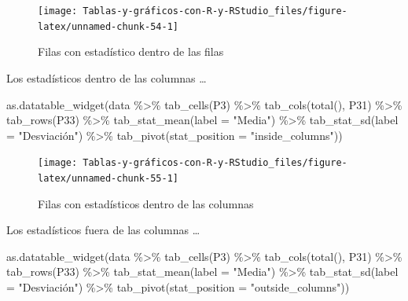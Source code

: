 \documentclass[
]{book}
\newenvironment{Shaded}{\begin{snugshade}}{\end{snugshade}}
\newcommand{\AttributeTok}[1]{\textcolor[rgb]{0.77,0.63,0.00}{#1}}
\newcommand{\FunctionTok}[1]{\textcolor[rgb]{0.00,0.00,0.00}{#1}}
\newcommand{\NormalTok}[1]{#1}
\newcommand{\SpecialCharTok}[1]{\textcolor[rgb]{0.00,0.00,0.00}{#1}}
\newcommand{\StringTok}[1]{\textcolor[rgb]{0.31,0.60,0.02}{#1}}
\begin{document}
\begin{figure}[H]

{\centering \texttt{[image: Tablas-y-gráficos-con-R-y-RStudio\_files/figure-latex/unnamed-chunk-54-1]} 

}

\caption{Filas con estadístico dentro de las filas}\label{fig:unnamed-chunk-54}
\end{figure}

Los estadísticos dentro de las columnas \ldots{}

\begin{Shaded}
\begin{Highlighting}[]
\FunctionTok{as.datatable\_widget}\NormalTok{(data }\SpecialCharTok{\%\textgreater{}\%} \FunctionTok{tab\_cells}\NormalTok{(P3) }\SpecialCharTok{\%\textgreater{}\%} \FunctionTok{tab\_cols}\NormalTok{(}\FunctionTok{total}\NormalTok{(), }
\NormalTok{  P31) }\SpecialCharTok{\%\textgreater{}\%} \FunctionTok{tab\_rows}\NormalTok{(P33) }\SpecialCharTok{\%\textgreater{}\%} \FunctionTok{tab\_stat\_mean}\NormalTok{(}\AttributeTok{label =} \StringTok{"Media"}\NormalTok{) }\SpecialCharTok{\%\textgreater{}\%} 
  \FunctionTok{tab\_stat\_sd}\NormalTok{(}\AttributeTok{label =} \StringTok{"Desviación"}\NormalTok{) }\SpecialCharTok{\%\textgreater{}\%} \FunctionTok{tab\_pivot}\NormalTok{(}\AttributeTok{stat\_position =} \StringTok{"inside\_columns"}\NormalTok{))}
\end{Highlighting}
\end{Shaded}

\begin{figure}[H]

{\centering \texttt{[image: Tablas-y-gráficos-con-R-y-RStudio\_files/figure-latex/unnamed-chunk-55-1]} 

}

\caption{Filas con estadísticos dentro de las columnas}\label{fig:unnamed-chunk-55}
\end{figure}

Los estadísticos fuera de las columnas \ldots{}

\begin{Shaded}
\begin{Highlighting}[]
\FunctionTok{as.datatable\_widget}\NormalTok{(data }\SpecialCharTok{\%\textgreater{}\%} \FunctionTok{tab\_cells}\NormalTok{(P3) }\SpecialCharTok{\%\textgreater{}\%} \FunctionTok{tab\_cols}\NormalTok{(}\FunctionTok{total}\NormalTok{(), }
\NormalTok{  P31) }\SpecialCharTok{\%\textgreater{}\%} \FunctionTok{tab\_rows}\NormalTok{(P33) }\SpecialCharTok{\%\textgreater{}\%} \FunctionTok{tab\_stat\_mean}\NormalTok{(}\AttributeTok{label =} \StringTok{"Media"}\NormalTok{) }\SpecialCharTok{\%\textgreater{}\%} 
  \FunctionTok{tab\_stat\_sd}\NormalTok{(}\AttributeTok{label =} \StringTok{"Desviación"}\NormalTok{) }\SpecialCharTok{\%\textgreater{}\%} \FunctionTok{tab\_pivot}\NormalTok{(}\AttributeTok{stat\_position =} \StringTok{"outside\_columns"}\NormalTok{))}
\end{Highlighting}
\end{Shaded}
\end{document}

